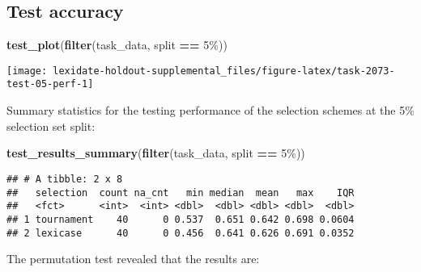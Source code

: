 \documentclass[
]{book}
\newenvironment{Shaded}{\begin{snugshade}}{\end{snugshade}}
\newcommand{\AttributeTok}[1]{\textcolor[rgb]{0.13,0.29,0.53}{#1}}
\newcommand{\DecValTok}[1]{\textcolor[rgb]{0.00,0.00,0.81}{#1}}
\newcommand{\FunctionTok}[1]{\textcolor[rgb]{0.13,0.29,0.53}{\textbf{#1}}}
\newcommand{\NormalTok}[1]{#1}
\newcommand{\OtherTok}[1]{\textcolor[rgb]{0.56,0.35,0.01}{#1}}
\newcommand{\SpecialCharTok}[1]{\textcolor[rgb]{0.81,0.36,0.00}{\textbf{#1}}}
\newcommand{\StringTok}[1]{\textcolor[rgb]{0.31,0.60,0.02}{#1}}
\begin{document}
\hypertarget{test-accuracy-40}{%
\subsection{Test accuracy}\label{test-accuracy-40}}

\begin{Shaded}
\begin{Highlighting}[]
\FunctionTok{test\_plot}\NormalTok{(}\FunctionTok{filter}\NormalTok{(task\_data, split }\SpecialCharTok{==} \StringTok{\textquotesingle{}5\%\textquotesingle{}}\NormalTok{))}
\end{Highlighting}
\end{Shaded}

\texttt{[image: lexidate-holdout-supplemental\_files/figure-latex/task-2073-test-05-perf-1]}

Summary statistics for the testing performance of the selection schemes at the 5\% selection set split:

\begin{Shaded}
\begin{Highlighting}[]
\FunctionTok{test\_results\_summary}\NormalTok{(}\FunctionTok{filter}\NormalTok{(task\_data, split }\SpecialCharTok{==} \StringTok{\textquotesingle{}5\%\textquotesingle{}}\NormalTok{))}
\end{Highlighting}
\end{Shaded}

\begin{verbatim}
## # A tibble: 2 x 8
##   selection  count na_cnt   min median  mean   max    IQR
##   <fct>      <int>  <int> <dbl>  <dbl> <dbl> <dbl>  <dbl>
## 1 tournament    40      0 0.537  0.651 0.642 0.698 0.0604
## 2 lexicase      40      0 0.456  0.641 0.626 0.691 0.0352
\end{verbatim}

The permutation test revealed that the results are:

\begin{Shaded}
\end{Shaded}
\end{document}
